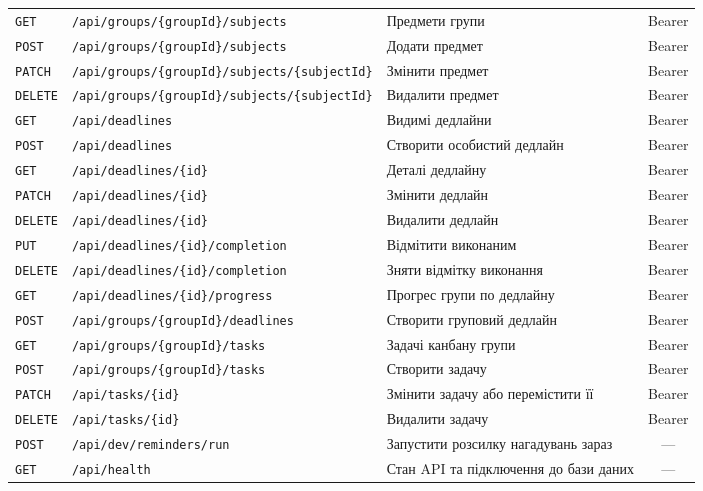\begin{longtable}{@{}l L{6.4cm} L{5.4cm} c@{}}
\texttt{GET} & \texttt{/\allowbreak{}api/\allowbreak{}groups/\allowbreak{}\{groupId\}/\allowbreak{}subjects} & Предмети групи & Bearer\\
\texttt{POST} & \texttt{/\allowbreak{}api/\allowbreak{}groups/\allowbreak{}\{groupId\}/\allowbreak{}subjects} & Додати предмет & Bearer\\
\texttt{PATCH} & \texttt{/\allowbreak{}api/\allowbreak{}groups/\allowbreak{}\{groupId\}/\allowbreak{}subjects/\allowbreak{}\{subjectId\}} & Змінити предмет & Bearer\\
\texttt{DELETE} & \texttt{/\allowbreak{}api/\allowbreak{}groups/\allowbreak{}\{groupId\}/\allowbreak{}subjects/\allowbreak{}\{subjectId\}} & Видалити предмет & Bearer\\
\texttt{GET} & \texttt{/\allowbreak{}api/\allowbreak{}deadlines} & Видимі дедлайни & Bearer\\
\texttt{POST} & \texttt{/\allowbreak{}api/\allowbreak{}deadlines} & Створити особистий дедлайн & Bearer\\
\texttt{GET} & \texttt{/\allowbreak{}api/\allowbreak{}deadlines/\allowbreak{}\{id\}} & Деталі дедлайну & Bearer\\
\texttt{PATCH} & \texttt{/\allowbreak{}api/\allowbreak{}deadlines/\allowbreak{}\{id\}} & Змінити дедлайн & Bearer\\
\texttt{DELETE} & \texttt{/\allowbreak{}api/\allowbreak{}deadlines/\allowbreak{}\{id\}} & Видалити дедлайн & Bearer\\
\texttt{PUT} & \texttt{/\allowbreak{}api/\allowbreak{}deadlines/\allowbreak{}\{id\}/\allowbreak{}completion} & Відмітити виконаним & Bearer\\
\texttt{DELETE} & \texttt{/\allowbreak{}api/\allowbreak{}deadlines/\allowbreak{}\{id\}/\allowbreak{}completion} & Зняти відмітку виконання & Bearer\\
\texttt{GET} & \texttt{/\allowbreak{}api/\allowbreak{}deadlines/\allowbreak{}\{id\}/\allowbreak{}progress} & Прогрес групи по дедлайну & Bearer\\
\texttt{POST} & \texttt{/\allowbreak{}api/\allowbreak{}groups/\allowbreak{}\{groupId\}/\allowbreak{}deadlines} & Створити груповий дедлайн & Bearer\\
\texttt{GET} & \texttt{/\allowbreak{}api/\allowbreak{}groups/\allowbreak{}\{groupId\}/\allowbreak{}tasks} & Задачі канбану групи & Bearer\\
\texttt{POST} & \texttt{/\allowbreak{}api/\allowbreak{}groups/\allowbreak{}\{groupId\}/\allowbreak{}tasks} & Створити задачу & Bearer\\
\texttt{PATCH} & \texttt{/\allowbreak{}api/\allowbreak{}tasks/\allowbreak{}\{id\}} & Змінити задачу або перемістити її & Bearer\\
\texttt{DELETE} & \texttt{/\allowbreak{}api/\allowbreak{}tasks/\allowbreak{}\{id\}} & Видалити задачу & Bearer\\
\texttt{POST} & \texttt{/\allowbreak{}api/\allowbreak{}dev/\allowbreak{}reminders/\allowbreak{}run} & Запустити розсилку нагадувань зараз & —\\
\texttt{GET} & \texttt{/\allowbreak{}api/\allowbreak{}health} & Стан API та підключення до бази даних & —\\
\bottomrule
\end{longtable}
